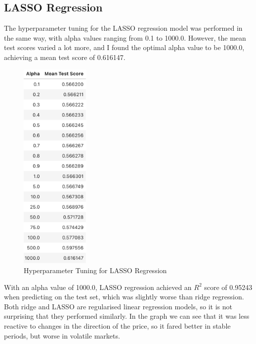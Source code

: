 \documentclass[a4paper, 11pt]{article}
\begin{document}
\subsection{LASSO Regression}
The hyperparameter tuning for the LASSO regression model was performed in the same way, with alpha values ranging from 0.1 to 1000.0. However, the mean test scores varied a lot more, and I found the optimal alpha value to be 1000.0, achieving a mean test score of 0.616147.

\begin{figure}[H]
    \begin{center}
        \includegraphics[width=0.3\textwidth]{Hyperparameter Tuning for LASSO Regression.png}
        \caption{Hyperparameter Tuning for LASSO Regression}
    \end{center}
\end{figure}

With an alpha value of 1000.0, LASSO regression achieved an $R^2$ score of 0.95243 when predicting on the test set, which was slightly worse than ridge regression. Both ridge and LASSO are regularised linear regression models, so it is not surprising that they performed similarly. In the graph we can see that it was less reactive to changes in the direction of the price, so it fared better in stable periods, but worse in volatile markets. 
\end{document}
